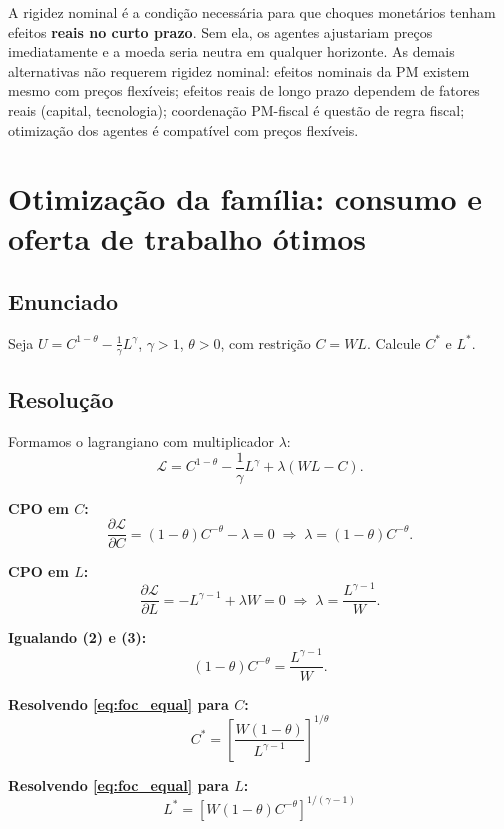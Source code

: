 \documentclass[12pt, a4paper]{article}
\begin{document}
\begin{resultbox}[title={Resposta: alternativa (e)}]
A rigidez nominal é a condição necessária para que choques monetários tenham efeitos
\textbf{reais no curto prazo}. Sem ela, os agentes ajustariam preços imediatamente e a
moeda seria neutra em qualquer horizonte. As demais alternativas não requerem rigidez
nominal: efeitos nominais da PM existem mesmo com preços flexíveis; efeitos reais de
longo prazo dependem de fatores reais (capital, tecnologia); coordenação PM-fiscal é
questão de regra fiscal; otimização dos agentes é compatível com preços flexíveis.
\end{resultbox}

\section{Otimização da família: consumo e oferta de trabalho ótimos}

\subsection*{Enunciado}
Seja $U = C^{1-\theta} - \tfrac{1}{\gamma}L^\gamma$, $\gamma>1$, $\theta>0$, com restrição
$C = WL$. Calcule $C^*$ e $L^*$.

\subsection*{Resolução}

Formamos o lagrangiano com multiplicador $\lambda$:
\begin{equation}
\mathcal{L} = C^{1-\theta} - \frac{1}{\gamma}L^\gamma + \lambda(WL - C).
\label{eq:lagr2}
\end{equation}

\textbf{CPO em $C$:}
\[
\frac{\partial\mathcal{L}}{\partial C} = (1-\theta)C^{-\theta} - \lambda = 0
\;\Longrightarrow\;
\lambda = (1-\theta)C^{-\theta}. \tag{2}
\]

\textbf{CPO em $L$:}
\[
\frac{\partial\mathcal{L}}{\partial L} = -L^{\gamma-1} + \lambda W = 0
\;\Longrightarrow\;
\lambda = \frac{L^{\gamma-1}}{W}. \tag{3}
\]

\textbf{Igualando (2) e (3):}
\begin{equation}
(1-\theta)C^{-\theta} = \frac{L^{\gamma-1}}{W}.
\label{eq:foc_equal}
\end{equation}

\begin{resultbox}[title={Consumo e oferta de trabalho ótimos}]
\textbf{Resolvendo \eqref{eq:foc_equal} para $C$:}
\[
\boxed{C^* = \left[\frac{W(1-\theta)}{L^{\gamma-1}}\right]^{1/\theta}}
\]

\textbf{Resolvendo \eqref{eq:foc_equal} para $L$:}
\[
\boxed{L^* = \left[W(1-\theta)C^{-\theta}\right]^{1/(\gamma-1)}}
\]
\end{resultbox}
\end{document}
